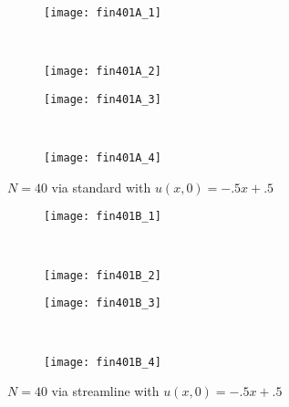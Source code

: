 \documentclass[10pt,letterpaper,fleqn]{article}
\begin{document}
\begin{figure}[h!]
        \centering
        \begin{subfigure}[b]{0.4\textwidth}
                \texttt{[image: fin401A\_1]}
        \end{subfigure}%
        ~ 
        \begin{subfigure}[b]{0.4\textwidth}
                \texttt{[image: fin401A\_2]}
        \end{subfigure}
        
        \begin{subfigure}[b]{0.4\textwidth}
                \texttt{[image: fin401A\_3]}
        \end{subfigure}
        ~
        \begin{subfigure}[b]{0.4\textwidth}
                \texttt{[image: fin401A\_4]}
        \end{subfigure}
        \caption{$N = 40$ via standard with $u(x,0) = -.5x + .5$}
\end{figure}

\begin{figure}[h!]
        \centering
        \begin{subfigure}[b]{0.4\textwidth}
                \texttt{[image: fin401B\_1]}
        \end{subfigure}%
        ~ 
        \begin{subfigure}[b]{0.4\textwidth}
                \texttt{[image: fin401B\_2]}
        \end{subfigure}
        
        \begin{subfigure}[b]{0.4\textwidth}
                \texttt{[image: fin401B\_3]}
        \end{subfigure}
        ~
        \begin{subfigure}[b]{0.4\textwidth}
                \texttt{[image: fin401B\_4]}
        \end{subfigure}
        \caption{$N = 40$ via streamline with $u(x,0) = -.5x + .5$}
\end{figure}
\end{document}
